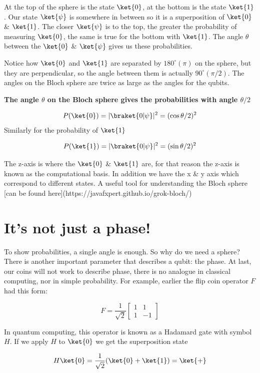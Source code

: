 \documentclass{book}
\begin{document}
At the top of the sphere  is the state $\ket{0}$, at the bottom is the state $\ket{1}$. Our state $\ket{\psi}$ is somewhere in between so it is a superposition of $\ket{0}$ \& $\ket{1}$. The closer $\ket{\psi}$  is to the top, the greater the probability of measuring $\ket{0}$, the same is true for the bottom with $\ket{1}$. The angle $\theta$ between the $\ket{0}$ \& $\ket{\psi}$ gives us these probabilities. 

Notice how $\ket{0}$ and $\ket{1}$ are separated by $180^{\circ} (\pi)$ on the sphere, but they are perpendicular, so the angle between them is actually $90 ^{\circ} (\pi/2)$. The angles on the Bloch sphere are twice as large as the angles for the qubits.

\textbf{The angle $\theta$ on the Bloch sphere gives the probabilities with angle $\theta/2$}

$$
P(\ket{0}) = |\braket{0|\psi}|^2 = (\cos{\theta/2})^2
$$
Similarly for the probability of $\ket{1}$

$$P(\ket{1}) = |\braket{0|\psi}|^2 = (\sin{\theta/2})^2$$

The z-axis is where the $\ket{0}$ \& $\ket{1}$ are, for that reason the z-axis is known as the computational basis. In addition we have the x \& y axis which correspond to different states. A useful tool for understanding the Bloch sphere [can be found here](https://javafxpert.github.io/grok-bloch/)

\section{It's not just a phase!} \label{It's not just a phase!}

To show probabilities, a single angle is enough. So why do we need a sphere? There is another important parameter that describes a qubit: the phase. At last, our coins will not work to describe phase, there is no analogue in classical computing, nor in simple probability. For example, earlier the flip coin operator $F$ had this form:

$$
F =  \frac{1}{\sqrt{2}} \begin{bmatrix} 1 & 1 \\ 1 & -1 \end{bmatrix}
$$

In quantum computing, this operator is known as a Hadamard gate with symbol $H$. 
If we apply $H$ to $\ket{0}$ we get the superposition state 

$$
H\ket{0} = \frac{1}{\sqrt{2}} ( \ket{0} + \ket{1}) = \ket{+}
$$
\end{document}

